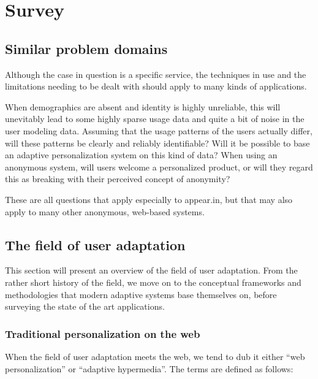 \chapter{Survey}

\label{Chapter2}


\section{Similar problem domains} %
\label{sec:similar_problem_domains}

Although the case in question is a specific service, the techniques in use and the limitations needing to be dealt with should apply to many kinds of applications.

When demographics are absent and identity is highly unreliable, this will unevitably lead to some highly sparse usage data and quite a bit of noise in the user modeling data.
Assuming that the usage patterns of the users actually differ, will these patterns be clearly and reliably identifiable?
Will it be possible to base an adaptive personalization system on this kind of data?
When using an anonymous system, will users welcome a personalized product, or will they regard this as breaking with their perceived concept of anonymity?

These are all questions that apply especially to appear.in, but that may also apply to many other anonymous, web-based systems.

\section{The field of user adaptation}
\label{sec:user_adaptation_survey}

This section will present an overview of the field of user adaptation. From the rather short history of the field, we move on to the conceptual frameworks and methodologies that modern adaptive systems base themselves on, before surveying the state of the art applications.

\subsection{Traditional personalization on the web}
\label{sub:traditional_web_personalization}

When the field of user adaptation meets the web, we tend to dub it either ``web personalization'' or ``adaptive hypermedia''. The terms are defined as follows:

